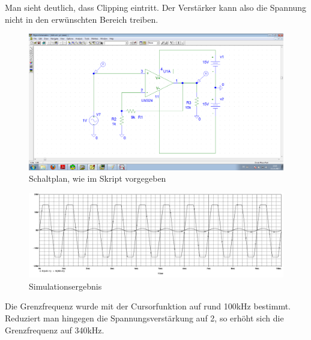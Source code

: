 Man sieht deutlich, dass Clipping eintritt. Der Verstärker kann also die Spannung nicht in den erwünschten Bereich treiben.
\begin{figure}[H]
	\centering
	\includegraphics[width=\linewidth]{versuch6/spice/schem623.png}
	\caption{Schaltplan, wie im Skript vorgegeben}
\end{figure}
\begin{figure}[H]
	\centering
	\includegraphics[width=\linewidth]{versuch6/spice/622.png}
	\caption{Simulationsergebnis}
\end{figure}
Die Grenzfrequenz wurde mit der Cursorfunktion auf rund 100kHz bestimmt. Reduziert man hingegen die Spannungsverstärkung auf 2, so erhöht sich die Grenzfrequenz auf 340kHz.%

